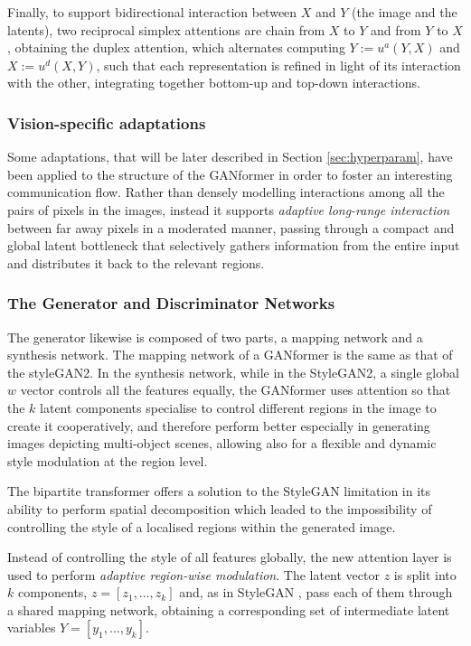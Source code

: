\documentclass{article}
\begin{document}
	Finally, to support bidirectional interaction between $X$ and $Y$ (the image and the latents), two 
	reciprocal simplex attentions are chain from $X$ to $Y$ and from $Y$ to $X$, obtaining the duplex 
	attention, which alternates computing $Y :=u^a(Y,X)$ and $X:=u^d(X,Y)$, such that each 
	representation is refined in light of its interaction with the other, integrating together bottom-up and 
	top-down interactions.
	
	\subsubsection{Vision-specific adaptations}%
	Some adaptations, that will be later described in Section \ref{sec:hyperparam}, have been applied to 
	the structure of the GANformer in order to foster an interesting communication flow. Rather than 
	densely modelling interactions among all the pairs of pixels in the images, instead it supports 
	\textit{adaptive long-range interaction} between far away pixels in a moderated manner, passing 
	through a compact and global latent bottleneck that selectively gathers information from the entire 
	input and distributes it back to the relevant regions. 
	
	\subsubsection{The Generator and Discriminator Networks}
	The generator likewise is composed of two parts, a mapping network and a synthesis network. The 
	mapping network of a GANformer is the same as that of the styleGAN2.
	In the synthesis network, while in the StyleGAN2, a single global $w$ vector controls all the features 
	equally, the GANformer uses attention so that the $k$ latent components specialise to control 
	different regions in the image to create it cooperatively, and therefore perform better especially in 
	generating images depicting multi-object scenes, allowing also for a flexible and dynamic style 
	modulation at the region level.
	
	The bipartite transformer offers a solution to the StyleGAN limitation in its ability to perform spatial 
	decomposition which leaded to the impossibility of controlling the style of a localised regions within 
	the generated image.
	
	Instead of controlling the style of all features globally, the new attention layer is used to perform 
	\textit{adaptive region-wise modulation}. The latent vector $z$ is split into $k$ components, $z = 
	[z_1 , \dots, z_k ]$ and, as in StyleGAN \cite{karras2019style}, pass each of them through a shared 
	mapping network, obtaining a corresponding set of intermediate latent variables $Y = [y_1 , ..., y_k 
	]$. 
	
\end{document}
